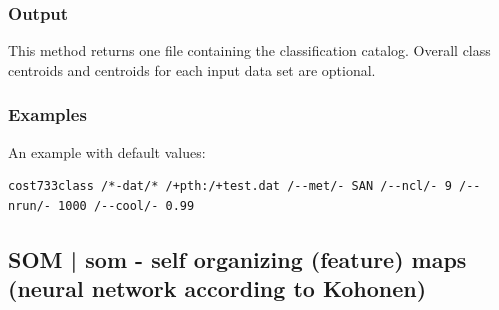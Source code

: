\documentclass[12pt, oneside, a4paper, headsepline, plainheadsepline]{scrbook}
\begin{document}
\subsubsection*{Output}
This method returns one file containing the classification catalog. 
Overall class centroids and centroids for each input data set are optional.

\subsubsection*{Examples}
An example with default values:
\begin{lstlisting}
cost733class /*-dat/* /+pth:/+test.dat /--met/- SAN /--ncl/- 9 /--nrun/- 1000 /--cool/- 0.99
\end{lstlisting}

%

\subsection{SOM | som - self organizing (feature) maps (neural network according to Kohonen)}
\end{document}
